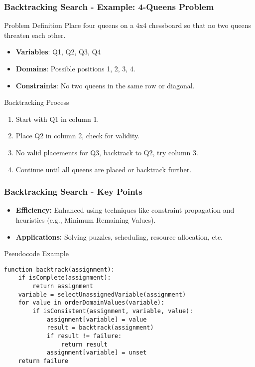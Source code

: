 \documentclass[aspectratio=169]{beamer}
\begin{document}
\begin{frame}[fragile]
    \frametitle{Backtracking Search - Example: 4-Queens Problem}
    \begin{block}{Problem Definition}
        Place four queens on a 4x4 chessboard so that no two queens threaten each other.
    \end{block}
    \begin{itemize}
        \item \textbf{Variables}: {Q1, Q2, Q3, Q4}
        \item \textbf{Domains}: Possible positions {1, 2, 3, 4}.
        \item \textbf{Constraints}: No two queens in the same row or diagonal.
    \end{itemize}
    
    \begin{block}{Backtracking Process}
        \begin{enumerate}
            \item Start with Q1 in column 1.
            \item Place Q2 in column 2, check for validity.
            \item No valid placements for Q3, backtrack to Q2, try column 3.
            \item Continue until all queens are placed or backtrack further.
        \end{enumerate}
    \end{block}
\end{frame}

\begin{frame}[fragile]
    \frametitle{Backtracking Search - Key Points}
    \begin{itemize}
        \item \textbf{Efficiency:} Enhanced using techniques like constraint propagation and heuristics (e.g., Minimum Remaining Values).
        \item \textbf{Applications:} Solving puzzles, scheduling, resource allocation, etc.
    \end{itemize}
    
    \begin{block}{Pseudocode Example}
        \begin{lstlisting}
function backtrack(assignment):
    if isComplete(assignment):
        return assignment
    variable = selectUnassignedVariable(assignment)
    for value in orderDomainValues(variable):
        if isConsistent(assignment, variable, value):
            assignment[variable] = value
            result = backtrack(assignment)
            if result != failure:
                return result
            assignment[variable] = unset
    return failure
        \end{lstlisting}
    \end{block}
\end{frame}
\end{document}
